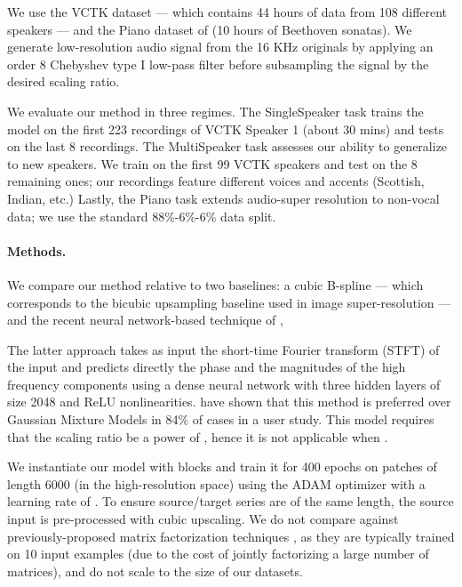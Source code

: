\documentclass{article} \usepackage{iclr2017_workshop,times}
\begin{document}
We use the VCTK dataset \citep{yamagishienglish} --- which contains 44 hours of data from 108 different speakers --- and the Piano dataset of \citet{mehri2016samplernn} (10 hours of  Beethoven sonatas). 
We generate low-resolution audio signal from the 16 KHz originals by applying an order 8 Chebyshev type I low-pass filter before subsampling the signal by the desired scaling ratio.

We evaluate our method in three regimes.
The {\sc SingleSpeaker} task trains the model on the first 223 recordings of VCTK Speaker 1 (about 30 mins) and tests on the last 8 recordings.
The {\sc MultiSpeaker} task assesses our ability to generalize to new speakers. We train on the first 99 VCTK speakers and test on the 8 remaining ones; our recordings feature different voices and accents (Scottish, Indian, etc.)
Lastly, the {\sc Piano} task extends audio-super resolution to non-vocal data; we use the standard 88\%-6\%-6\% data split.


\paragraph{Methods.}

We compare our method relative to two baselines: a cubic B-spline --- which corresponds to the bicubic upsampling baseline used in image super-resolution --- and the recent neural network-based technique of \citet{li2015dnn}, 



The latter approach takes as input the short-time Fourier transform (STFT) of the input and predicts directly the phase and the magnitudes of the high frequency components using a dense neural network with three hidden layers of size 2048 and ReLU nonlinearities.
\citet{li2015dnn} have shown that this method is preferred over Gaussian Mixture Models in 84\% of cases in a user study.
This model requires that the scaling ratio be a power of , hence it is not applicable when .


We instantiate our model with  blocks and train it for 400 epochs on patches of length 6000 (in the high-resolution space) using the ADAM optimizer with a learning rate of . To ensure source/target series are of the same length, the source input is pre-processed with cubic upscaling.
We do not compare against previously-proposed matrix factorization techniques \citep{Bansal05bandwidthexpansion,DBLP:conf/ismir/LiangHE13}, as they are typically trained on  10 input examples \citep{DBLP:conf/mlsp/SunM13} (due to the cost of jointly factorizing a large number of matrices), and do not scale to the size of our datasets.
\end{document}
